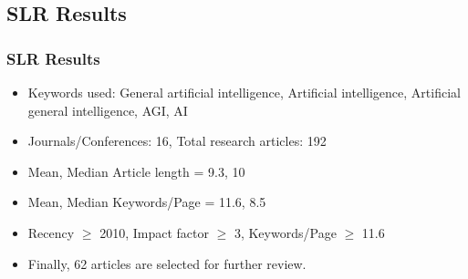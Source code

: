 \documentclass[
	11pt, %
]{beamer}
\begin{document}

\subsection{SLR Results}
\begin{frame}
	\frametitle{SLR Results}
		
	\begin{itemize}

        \item Keywords used: General artificial intelligence, Artificial intelligence, Artificial general intelligence, AGI, AI

        \bigskip %
    	\item Journals/Conferences: 16, Total research articles: 192

        \bigskip %
    	\item Mean, Median Article length = 9.3, 10

        \bigskip %
    	\item Mean, Median Keywords/Page = 11.6, 8.5
     
        \bigskip %
        \item Recency $\geq$ 2010, Impact factor $\geq$ 3, Keywords/Page $\geq$ 11.6
        
        \bigskip %
        \item Finally, 62 articles are selected for further review.

	\end{itemize}
 
\end{frame}


\end{document}
